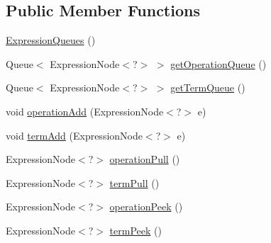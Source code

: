 \subsection*{Public Member Functions}
\begin{DoxyCompactItemize}
\item 
\hyperlink{classit_1_1emarolab_1_1cagg_1_1core_1_1language_1_1syntax_1_1expressionTree_1_1ExpressionTreeGenerator_1_1ExpressionQueues_a4b53eea418ac9d6cbe67916200338990}{Expression\-Queues} ()
\item 
Queue$<$ Expression\-Node$<$?$>$ $>$ \hyperlink{classit_1_1emarolab_1_1cagg_1_1core_1_1language_1_1syntax_1_1expressionTree_1_1ExpressionTreeGenerator_1_1ExpressionQueues_af6fe54df1f73d534479d26849d96f148}{get\-Operation\-Queue} ()
\item 
Queue$<$ Expression\-Node$<$?$>$ $>$ \hyperlink{classit_1_1emarolab_1_1cagg_1_1core_1_1language_1_1syntax_1_1expressionTree_1_1ExpressionTreeGenerator_1_1ExpressionQueues_a2bd1fdd3a4b967b54b513086004b0cda}{get\-Term\-Queue} ()
\item 
void \hyperlink{classit_1_1emarolab_1_1cagg_1_1core_1_1language_1_1syntax_1_1expressionTree_1_1ExpressionTreeGenerator_1_1ExpressionQueues_a3e6fcdded89a70d4d8e06a6d9981ecb2}{operation\-Add} (Expression\-Node$<$?$>$ e)
\item 
void \hyperlink{classit_1_1emarolab_1_1cagg_1_1core_1_1language_1_1syntax_1_1expressionTree_1_1ExpressionTreeGenerator_1_1ExpressionQueues_a6a962bc906dba12a064432c641980d70}{term\-Add} (Expression\-Node$<$?$>$ e)
\item 
Expression\-Node$<$?$>$ \hyperlink{classit_1_1emarolab_1_1cagg_1_1core_1_1language_1_1syntax_1_1expressionTree_1_1ExpressionTreeGenerator_1_1ExpressionQueues_ac30aa67266aecd06af5f46a23491d3fb}{operation\-Pull} ()
\item 
Expression\-Node$<$?$>$ \hyperlink{classit_1_1emarolab_1_1cagg_1_1core_1_1language_1_1syntax_1_1expressionTree_1_1ExpressionTreeGenerator_1_1ExpressionQueues_a3bde9cf43413d553dd12fe145ab98476}{term\-Pull} ()
\item 
Expression\-Node$<$?$>$ \hyperlink{classit_1_1emarolab_1_1cagg_1_1core_1_1language_1_1syntax_1_1expressionTree_1_1ExpressionTreeGenerator_1_1ExpressionQueues_ab2fe0d4a4a1b40ebddf2dfcb0511f0c4}{operation\-Peek} ()
\item 
Expression\-Node$<$?$>$ \hyperlink{classit_1_1emarolab_1_1cagg_1_1core_1_1language_1_1syntax_1_1expressionTree_1_1ExpressionTreeGenerator_1_1ExpressionQueues_ac6c2bf8951b3993da780996b45d831eb}{term\-Peek} ()

\end{DoxyCompactItemize}
